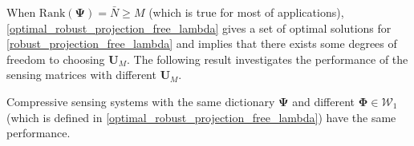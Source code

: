 \documentclass[final,5p,times,twocolumn]{elsarticle}
\begin{document}
When $\text{Rank}(\bm\Psi)=\bar N \geq M$ (which is true for most of applications),
\eqref{optimal_robust_projection_free_lambda} gives a set of optimal solutions for \eqref{robust_projection_free_lambda} and implies that there exists some degrees of freedom to choosing $\bm U_M$. The following result investigates the performance of the sensing matrices with different $\bm U_M$.
%
\begin{lemma}
	Compressive sensing systems with the same dictionary $\bm \Psi$  and different $\bm \Phi\in \mathcal W_1$ (which is defined in \eqref{optimal_robust_projection_free_lambda}) have the same performance.
	\label{lem:equivalence of Phi}
\end{lemma}
\end{document}
